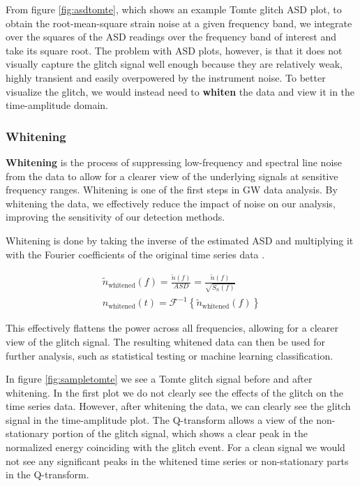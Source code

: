 \documentclass[12pt]{article}
\begin{document}
\medskip
\noindent From figure \ref{fig:asdtomte}, which shows an example Tomte glitch ASD plot, to obtain the root-mean-square strain noise at a given frequency band, we integrate over the squares of the ASD readings over the frequency band of interest and take its square root. The problem with ASD plots, however, is that it does not visually capture the glitch signal well enough because they are relatively weak, highly transient and easily overpowered by the instrument noise. To better visualize the glitch, we would instead need to \textbf{whiten} the data and view it in the time-amplitude domain.


\subsubsection{Whitening}\label{Whitening}

\textbf{Whitening} is the process of suppressing low-frequency and spectral line noise from the data to allow for a clearer view of the underlying signals at sensitive frequency ranges. Whitening is one of the first steps in GW data analysis. By whitening the data, we effectively reduce the impact of noise on our analysis, improving the sensitivity of our detection methods.

\medskip
\noindent Whitening is done by taking the inverse of the estimated ASD and multiplying it with the Fourier coefficients of the original time series data \cite{collaboration_guide_2020}.

\begin{align}
    \tilde{n}_\text{whitened}(f) = \frac{\tilde{n}(f)}{ASD} = \frac{\tilde{n}(f)}{\sqrt{S_n(f)}} \\
    n_\text{whitened}(t) = \mathcal{F}^{-1} \left\{ \tilde{n}_\text{whitened}(f) \right\}
    \label{eq:whitening}
\end{align}

\medskip
\noindent This effectively flattens the power across all frequencies, allowing for a clearer view of the glitch signal. The resulting whitened data can then be used for further analysis, such as statistical testing or machine learning classification.

\medskip
\noindent In figure \ref{fig:sampletomte} we see a Tomte glitch signal before and after whitening. In the first plot we do not clearly see the effects of the glitch on the time series data. However, after whitening the data, we can clearly see the glitch signal in the time-amplitude plot. The Q-transform allows a view of the non-stationary portion of the glitch signal, which shows a clear peak in the normalized energy coinciding with the glitch event. For a clean signal we would not see any significant peaks in the whitened time series or non-stationary parts in the Q-transform.
\end{document}
